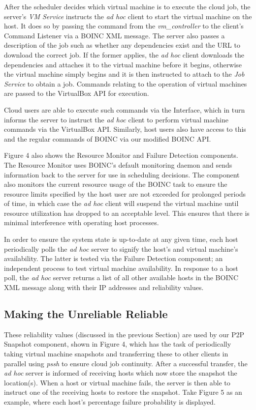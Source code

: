 \documentclass[10pt, conference, compsocconf]{IEEEtran}
\begin{document}
\noindent After the scheduler decides which virtual machine is to execute the cloud job, the server's \textit{VM Service} instructs the \textit{ad hoc} client to start the virtual machine on the host. It does so by passing the command from the \textit{vm\_controller} to the client's Command Listener via a BOINC XML message. The server also passes a description of the job such as whether any dependencies exist and the URL to download the correct job. If the former applies, the \textit{ad hoc} client downloads the dependencies and attaches it to the virtual machine before it begins, otherwise the virtual machine simply begins and it is then instructed to attach to the \textit{Job Service} to obtain a job. Commands relating to the operation of virtual machines are passed to the VirtualBox API for execution.

Cloud users are able to execute such commands via the Interface, which in turn informs the server to instruct the \textit{ad hoc} client to perform virtual machine commands via the VirtualBox API. Similarly, host users also have access to this and the regular commands of BOINC via our modified BOINC API. 

Figure 4 also shows the Resource Monitor and Failure Detection components. The Resource Monitor uses BOINC's default monitoring daemon and sends information back to the server for use in scheduling decisions. The component also monitors the current resource usage of the BOINC task to ensure the resource limits specified by the host user are not exceeded for prolonged periods of time, in which case the \textit{ad hoc} client will suspend the virtual machine until resource utilization has dropped to an acceptable level. This ensures that there is minimal interference with operating host processes.

In order to ensure the system state is up-to-date at any given time, each host periodically polls the \textit{ad hoc} server to signify the host's and virtual machine's availability. The latter is tested via the Failure Detection component; an independent process to test virtual machine availability. In response to a host poll, the \textit{ad hoc} server returns a list of all other available hosts in the BOINC XML message along with their IP addresses and reliability values.

\subsection{Making the Unreliable Reliable}
These reliability values (discussed in the previous Section) are used by our P2P Snapshot component, shown in Figure 4, which has the task of periodically taking virtual machine snapshots and transferring these to other clients in parallel using \textit{pssh} \cite{pssh} to ensure cloud job continuity. After a successful transfer, the \textit{ad hoc} server is informed of receiving hosts which now store the snapshot the location(s). When a host or virtual machine fails, the server is then able to instruct one of the receiving hosts to restore the snapshot. Take Figure 5 as an example, where each host's percentage failure probability is displayed.
\end{document}
